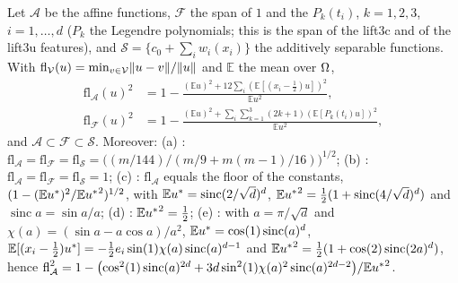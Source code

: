 \begin{proposition}\label{sA_proofs:prop:floorsC}
Let $\mathcal A$ be the affine functions, $\mathcal F$ the span of $1$ and the $P_k(t_i)$, $k=1,2,3$,
$i=1,\dots,d$ ($P_k$ the Legendre polynomials; this is the span of the lift3c and of the lift3u
features), and $\mathcal S=\{c_0+\sum_iw_i(x_i)\}$ the additively separable functions. With
$\mathrm{fl}_{\mathcal V}(u)=\min_{v\in\mathcal V}\lVert u-v\rVert/\lVert u\rVert$ and $\mathbb E$ the mean over $\Omega$,
\begin{align*}
\mathrm{fl}_{\mathcal A}(u)^2&=1-\frac{(\mathbb Eu)^2+12\sum_i(\mathbb E[(x_i-\frac12)u])^2}{\mathbb Eu^2},\\
\mathrm{fl}_{\mathcal F}(u)^2&=1-\frac{(\mathbb Eu)^2+\sum_i\sum_{k=1}^3(2k+1)(\mathbb E[P_k(t_i)u])^2}{\mathbb Eu^2},
\end{align*}
and $\mathcal A\subset\mathcal F\subset\mathcal S$. Moreover:
(a) \Pone: $\mathrm{fl}_{\mathcal A}=\mathrm{fl}_{\mathcal F}=\mathrm{fl}_{\mathcal S}
=\bigl((m/144)/(m/9+m(m-1)/16)\bigr)^{1/2}$;
(b) \Pcospair: $\mathrm{fl}_{\mathcal A}=\mathrm{fl}_{\mathcal F}=\mathrm{fl}_{\mathcal S}=1$;
(c) \Pridge: $\mathrm{fl}_{\mathcal A}$ equals the floor of the constants,
$(1-(\mathbb Eu^{*})^2/\mathbb E{u^{*}}^2)^{1/2}$, with $\mathbb Eu^{*}=\operatorname{sinc}(2/\sqrt d)^d$,
$\mathbb E{u^{*}}^2=\frac12(1+\operatorname{sinc}(4/\sqrt d)^d)$ and $\operatorname{sinc}a=\sin a/a$;
(d) \Ptwo: $\mathbb E{u^{*}}^2=\frac12$;
(e) \Paltridge: with $a=\pi/\sqrt d$ and $\chi(a)=(\sin a-a\cos a)/a^2$,
$\mathbb Eu^{*}=\cos(1)\operatorname{sinc}(a)^d$,
$\mathbb E[(x_i-\frac12)u^{*}]=-\frac12e_i\sin(1)\chi(a)\operatorname{sinc}(a)^{d-1}$ and
$\mathbb E{u^{*}}^2=\frac12(1+\cos(2)\operatorname{sinc}(2a)^d)$, hence
$\mathrm{fl}_{\mathcal A}^2=1-\bigl(\cos^2(1)\operatorname{sinc}(a)^{2d}+3d\sin^2(1)\chi(a)^2\operatorname{sinc}(a)^{2d-2}\bigr)/\mathbb E{u^{*}}^2$.
\end{proposition}
